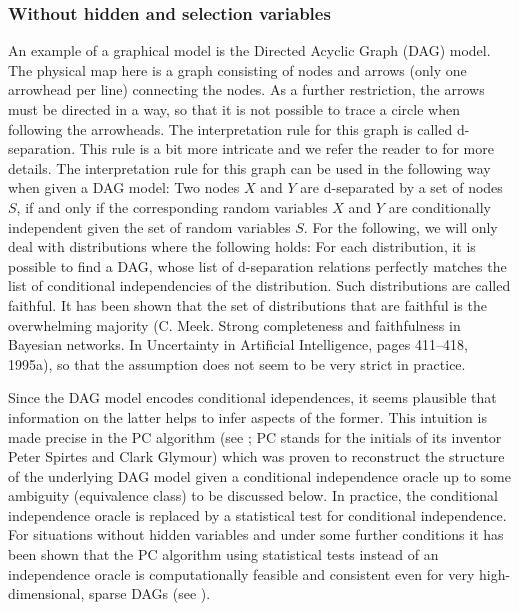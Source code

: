 \documentclass[article]{jss}
\begin{document}
\subsubsection{Without hidden and selection variables}
An example of a graphical model is the Directed Acyclic Graph (DAG)
model. The physical map here is a graph consisting of nodes and arrows
(only one arrowhead per line) connecting the nodes. As a further
restriction, the arrows must be directed in a way, so that it is not
possible to trace a circle when following the arrowheads. The
interpretation rule for this graph is called d-separation. This rule is a
bit more intricate and we refer the reader to \cite{lauritzen} for more
details. The interpretation rule for this graph can be used in the
following way when given a DAG model: Two nodes $X$ and $Y$ are d-separated
by a set of nodes $S$, if and only if the corresponding random variables
$X$ and $Y$ are conditionally independent given the set of random variables
$S$. For the following, we will only deal with distributions where the
following holds: For each distribution, it is possible to find a DAG, whose
list of d-separation relations perfectly matches the list of conditional
independencies of the distribution. Such distributions are called
faithful. It has been shown that the set of distributions that are faithful
is the overwhelming majority (C. Meek. Strong completeness and faithfulness
in Bayesian networks. In Uncertainty in Artificial Intelligence, pages
411–418, 1995a), so that the assumption does not seem to be very strict in
practice.

Since the DAG model encodes conditional idependences, it seems plausible
that information on the latter helps to infer aspects of the former. This
intuition is made precise in the PC algorithm (see \cite{SpirtesEtAl00}; PC stands for the
initials of its inventor Peter Spirtes and Clark Glymour) which was proven
to reconstruct the structure of the underlying DAG model given a
conditional independence oracle up to some ambiguity (equivalence class)
to be discussed below. In practice, the conditional independence oracle is
replaced by a statistical test for conditional independence. For situations
without hidden variables and under some further conditions it has been
shown that the PC algorithm using statistical tests instead of an
independence oracle is computationally feasible and consistent even for very
high-dimensional, sparse DAGs (see \cite{KaBu07a}).
\end{document}
